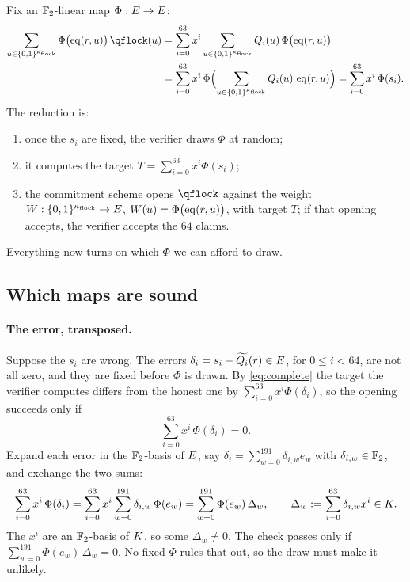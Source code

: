 Fix an $\mathbb{F}_2$-linear map $\Phi:E\to E$:
\begin{equation}
\begin{split}
\sum_{u\in\cube{\nflock}}\Phi\bigl(\eq(r,u)\bigr)\,\qflock(u)
&=\sum_{i=0}^{63}x^i\sum_{u\in\cube{\nflock}}Q_i(u)\,\Phi\bigl(\eq(r,u)\bigr)\\
&=\sum_{i=0}^{63}x^i\,\Phi\Bigl(\sum_{u\in\cube{\nflock}}Q_i(u)\,\eq(r,u)\Bigr)
=\sum_{i=0}^{63}x^i\,\Phi(s_i).
\end{split}
\label{eq:complete}
\end{equation}
The reduction is:
\begin{enumerate}
\item once the $s_i$ are fixed, the verifier draws $\Phi$ at random;
\item it computes the target $T=\sum_{i=0}^{63}x^i\Phi(s_i)$;
\item the commitment scheme opens $\qflock$ against the weight $W:\{0,1\}^{\kappa_{\mathrm{flock}}}\to E$, $W(u)=\Phi\bigl(\operatorname{eq}(r,u)\bigr)$, with target $T$; if that opening accepts, the verifier accepts the $64$ claims.
\end{enumerate}
Everything now turns on which $\Phi$ we can afford to draw.

\subsection{Which maps are sound}\label{rs:sound-maps}

\paragraph{The error, transposed.} Suppose the $s_i$ are wrong. The errors $\delta_i=s_i-\widetilde{Q_i}(r)\in E$, for $0\le i<64$, are not all zero, and they are fixed before $\Phi$ is drawn. By \eqref{eq:complete} the target the verifier computes differs from the honest one by $\sum_{i=0}^{63}x^i\Phi(\delta_i)$, so the opening succeeds only if
\[
\sum_{i=0}^{63}x^i\,\Phi(\delta_i)=0.
\]
Expand each error in the $\mathbb{F}_2$-basis of $E$, say $\delta_i=\sum_{w=0}^{191}\delta_{i,w}e_w$ with $\delta_{i,w}\in\mathbb{F}_2$, and exchange the two sums:
\begin{equation}
\sum_{i=0}^{63}x^i\,\Phi(\delta_i)
=\sum_{i=0}^{63}x^i\sum_{w=0}^{191}\delta_{i,w}\,\Phi(e_w)
=\sum_{w=0}^{191}\Phi(e_w)\,\Delta_w,
\qquad
\Delta_w:=\sum_{i=0}^{63}\delta_{i,w}x^i\in K.
\label{eq:transpose}
\end{equation}
The $x^i$ are an $\mathbb{F}_2$-basis of $K$, so some $\Delta_w\neq0$. The check passes only if $\sum_{w=0}^{191}\Phi(e_w)\,\Delta_w=0$. No fixed $\Phi$ rules that out, so the draw must make it unlikely.

